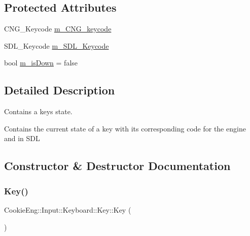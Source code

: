 \subsection*{Protected Attributes}
\begin{DoxyCompactItemize}
\item 
C\+N\+G\+\_\+\+Keycode \hyperlink{class_cookie_eng_1_1_input_1_1_keyboard_1_1_key_a3db742c409fa61f02d4dfac63b6cf8fe}{m\+\_\+\+C\+N\+G\+\_\+keycode}
\item 
S\+D\+L\+\_\+\+Keycode \hyperlink{class_cookie_eng_1_1_input_1_1_keyboard_1_1_key_afe0710d351e77160764ca176a13ead32}{m\+\_\+\+S\+D\+L\+\_\+\+Keycode}
\item 
bool \hyperlink{class_cookie_eng_1_1_input_1_1_keyboard_1_1_key_a85482b8698044d597eb4e09adbcd2d31}{m\+\_\+is\+Down} = false
\end{DoxyCompactItemize}


\subsection{Detailed Description}
Contains a key\textquotesingle{}s state. 

Contains the current state of a key with its corresponding code for the engine and in S\+DL 

\subsection{Constructor \& Destructor Documentation}
\mbox{\label{class_cookie_eng_1_1_input_1_1_keyboard_1_1_key_a263217e998b290d7e740ded3a76e06de}} 
\subsubsection{\texorpdfstring{Key()}{Key()}\hspace{0.1cm}{\footnotesize\ttfamily [1/2]}}
{\footnotesize\ttfamily Cookie\+Eng\+::\+Input\+::\+Keyboard\+::\+Key\+::\+Key (\begin{DoxyParamCaption}{ }\end{DoxyParamCaption})\hspace{0.3cm}{\ttfamily [inline]}}



